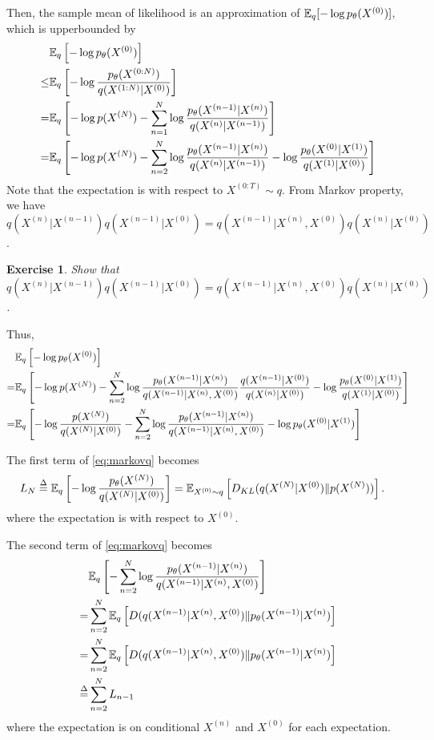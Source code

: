 \documentclass[11pt]{article}
\newtheorem{exercise}{Exercise}
\begin{document}
Then, the sample mean of likelihood is an approximation of $\mathbb{E}_q[-\log p_{\theta}(X^{(0)})]$, which is upperbounded by
\begin{align}
    &\mathbb{E}_q\left[-\log p_{\theta}(X^{(0)})\right] \\
    \leq& \mathbb{E}_q\left[-\log \frac{p_{\theta}(X^{(0:N)})}{q(X^{(1:N)}|X^{(0)})} \right]\\
    =& \mathbb{E}_q\left[-\log p (X^{(N)}) - \sum_{n=1}^N \log \frac{p_{\theta}(X^{(n-1)}|X^{(n)})}{q(X^{(n)}|X^{(n-1)})} \right]\\
    =& \mathbb{E}_q\left[-\log p (X^{(N)}) - \sum_{n=2}^N \log \frac{p_{\theta}(X^{(n-1)}|X^{(n)})}{q(X^{(n)}|X^{(n-1)})} -\log \frac{p_{\theta}(X^{(0)}|X^{(1)})}{q(X^{(1)}|X^{(0)})}\right]
\end{align}
Note that the expectation is with respect to $X^{(0:T)}\sim q$.
From Markov property, we have $q(X^{(n)}|X^{(n-1)}) q(X^{(n-1)}|X^{(0)}) = q(X^{(n-1)}|X^{(n)}, X^{(0)}) q(X^{(n)}|X^{(0)})$.
\begin{exercise}
    Show that $q(X^{(n)}|X^{(n-1)}) q(X^{(n-1)}|X^{(0)}) = q(X^{(n-1)}|X^{(n)}, X^{(0)}) q(X^{(n)}|X^{(0)})$.
\end{exercise}
Thus,
\begin{align}
    &\mathbb{E}_q\left[-\log p_{\theta}(X^{(0)})\right] \\
    =& \mathbb{E}_q\left[-\log p (X^{(N)}) 
        - \sum_{n=2}^N \log \frac{p_{\theta}(X^{(n-1)}|X^{(n)})}{q(X^{(n-1)}|X^{(n)}, X^{(0)})}\frac{q(X^{(n-1)}|X^{(0)})}{q(X^{(n)}|X^{(0)})} 
        -\log \frac{p_{\theta}(X^{(0)}|X^{(1)})}{q(X^{(1)}|X^{(0)})}\right]\\
    =& \mathbb{E}_q\left[-\log \frac{p(X^{(N)})}{q(X^{(N)}|X^{(0)})} - \sum_{n=2}^N \log \frac{p_{\theta}(X^{(n-1)}|X^{(n)})}{q(X^{(n-1)}|X^{(n)}, X^{(0)})} -\log p_{\theta}(X^{(0)}|X^{(1)})\right]\label{eq:markovq}
\end{align}


The first term of \eqref{eq:markovq} becomes
\begin{align}
    L_N \stackrel{\Delta}{=} \mathbb{E}_q\left[-\log \frac{p_\theta (X^{(N)})}{q(X^{(N)}|X^{(0)})}\right]
    &= \mathbb{E}_{X^{(0)}\sim q}\left[D_{KL}(q(X^{(N)}|X^{(0)}) \| p(X^{(N)}))\right].
\end{align}
where the expectation is with respect to $X^{(0)}$.

The second term of \eqref{eq:markovq} becomes
\begin{align}
    &\mathbb{E}_q\left[- \sum_{n=2}^N \log \frac{p_{\theta}(X^{(n-1)}|X^{(n)})}{q(X^{(n-1)}|X^{(n)}, X^{(0)})}\right]\\
    =& \sum_{n=2}^N \mathbb{E}_q \left[ D (q(X^{(n-1)}|X^{(n)}, X^{(0)}) \| p_{\theta}(X^{(n-1)}|X^{(n)})\right]\\
    =& \sum_{n=2}^N \mathbb{E}_q \left[ D (q(X^{(n-1)}|X^{(n)}, X^{(0)}) \| p_{\theta}(X^{(n-1)}|X^{(n)})\right]\\
    \stackrel{\Delta}{=}& \sum_{n=2}^N L_{n-1}
\end{align}
where the expectation is on conditional $X^{(n)}$ and $X^{(0)}$ for each expectation.
\end{document}
